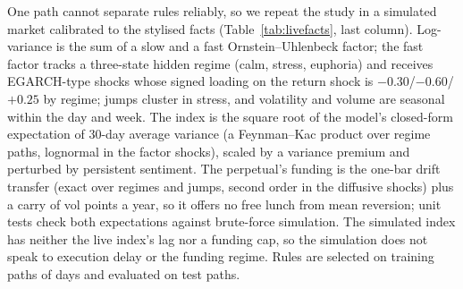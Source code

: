 \documentclass[10pt,a4paper]{article}
\begin{document}
One path cannot separate rules reliably, so we repeat the study in a simulated market calibrated to the stylised facts (Table~\ref{tab:livefacts}, last column). Log-variance is the sum of a slow and a fast Ornstein--Uhlenbeck factor; the fast factor tracks a three-state hidden regime (calm, stress, euphoria) and receives EGARCH-type shocks \citep{nelson1991conditional} whose signed loading on the return shock is $-0.30$\slash$-0.60$\slash$+0.25$ by regime; jumps cluster in stress, and volatility and volume are seasonal within the day and week. The index is the square root of the model's closed-form expectation of 30-day average variance (a Feynman--Kac product over regime paths, lognormal in the factor shocks), scaled by a variance premium and perturbed by persistent sentiment. The perpetual's funding is the one-bar drift transfer (exact over regimes and jumps, second order in the diffusive shocks) plus a carry of \HedgeCarry{} vol points a year, so it offers no free lunch from mean reversion; unit tests check both expectations against brute-force simulation. The simulated index has neither the live index's lag nor a funding cap, so the simulation does not speak to execution delay or the funding regime. Rules are selected on \NTrain{} training paths of \SimDays{} days and evaluated on \NTest{} test paths.

\begin{table}[t]
\centering\small

\caption{Simulation: hedging a long-BTC book on \NTest{} test paths (medians; \% unless stated). Columns as in Table~\ref{tab:livehedge}, but with fills on the signal bar; Carry: funding carry paid (\% of BTC notional a year); Time on: share of bars hedged. Placebo timing: the selected ratchet with circularly shifted triggers (mean of \NPlacebo{} shifts).}
\label{tab:simhedge}
\end{table}
\end{document}
